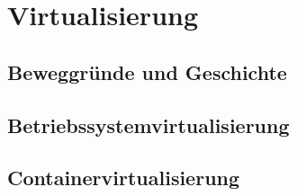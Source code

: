 \chapter{Virtualisierung}
\label{cha:virtualisierung}
\section{Beweggründe und Geschichte}
\label{sec:virtualisierungsgeschichte}
\section{Betriebssystemvirtualisierung}
\label{sec:betriebssystemvirtualisierung}
\section{Containervirtualisierung}
\label{sec:containervirtualisierung}
